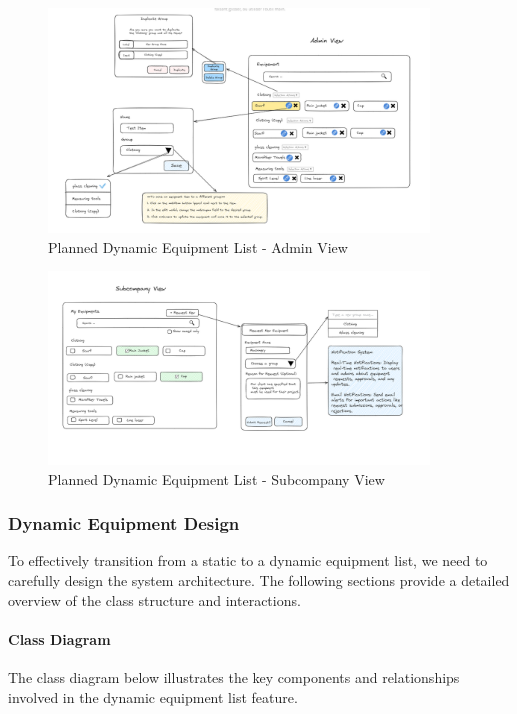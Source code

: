     
    \begin{figure}[H]
        \centering
        \includegraphics[width=0.9\textwidth]{src/assets/chapters/DynamicEquipementAdmin.PNG}
        \caption{Planned Dynamic Equipment List - Admin View}
        \label{fig:dynamic_equipment_list_admin}
    \end{figure}
    
    \begin{figure}[H]
        \centering
        \includegraphics[width=0.9\textwidth]{src/assets/chapters/DynamicEquipementSubcompany.PNG}
        \caption{Planned Dynamic Equipment List - Subcompany View}
        \label{fig:dynamic_equipment_list_subcompany}
    \end{figure}
    \subsubsection{Dynamic Equipment Design}
To effectively transition from a static to a dynamic equipment list, we need to carefully design the system architecture. The following sections provide a detailed overview of the class structure and interactions.

\paragraph{Class Diagram}
The class diagram below illustrates the key components and relationships involved in the dynamic equipment list feature.

